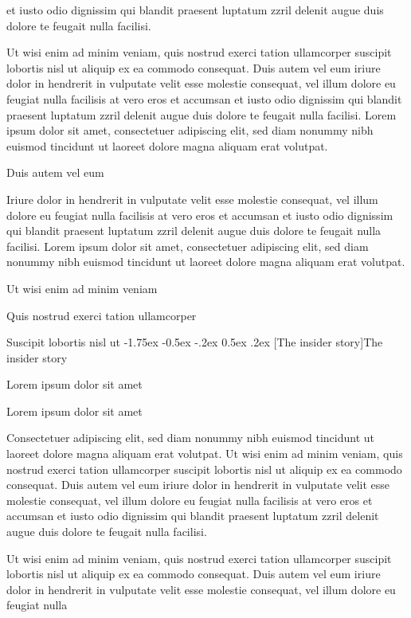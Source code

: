 \documentclass[11pt,twoside]{article}\makeatletter
\makeatletter
\renewcommand\section{\@startsection {section}{1}{\z@}%
     {-1.75ex \@plus -0.5ex \@minus -.2ex}%
     {0.5ex \@plus .2ex}%
     {\reset@font\Large\bfseries\sffamily}}
\renewcommand\subsection{\@startsection{subsection}{2}{\z@}%
     {-1.75ex\@plus -0.5ex \@minus- .2ex}%
     {0.5ex \@plus .2ex}%
     {\reset@font\Large\sffamily}}
\def\DivII{\subsection}
\def\DivII{\section}
\makeatother
\begin{document}
      et iusto odio dignissim qui blandit praesent luptatum zzril delenit
      augue duis dolore te feugait nulla facilisi.\par Ut wisi enim ad minim veniam, quis nostrud exerci tation
      ullamcorper suscipit lobortis nisl ut aliquip ex ea commodo
      consequat. Duis autem vel eum iriure dolor in hendrerit in vulputate
      velit esse molestie consequat, vel illum dolore eu feugiat nulla
      facilisis at vero eros et accumsan et iusto odio dignissim qui blandit
      praesent luptatum zzril delenit augue duis dolore te feugait nulla
      facilisi. Lorem ipsum dolor sit amet, consectetuer adipiscing elit,
      sed diam nonummy nibh euismod tincidunt ut laoreet dolore magna
      aliquam erat volutpat. \par Duis autem vel eum \par Iriure dolor in hendrerit in vulputate velit esse molestie
      consequat, vel illum dolore eu feugiat nulla facilisis at vero eros et
      accumsan et iusto odio dignissim qui blandit praesent luptatum zzril
      delenit augue duis dolore te feugait nulla facilisi. Lorem ipsum dolor
      sit amet, consectetuer adipiscing elit, sed diam nonummy nibh euismod
      tincidunt ut laoreet dolore magna aliquam erat volutpat. \par Ut wisi enim ad minim veniam\par Quis nostrud exerci tation ullamcorper \par Suscipit lobortis nisl ut 
\DivII[The insider story]{The insider story}\label{part2.1}\par Lorem ipsum dolor sit amet\par Lorem ipsum dolor sit amet\par Consectetuer adipiscing elit, sed diam nonummy nibh euismod
      tincidunt ut laoreet dolore magna aliquam erat volutpat. Ut wisi enim
      ad minim veniam, quis nostrud exerci tation ullamcorper suscipit
      lobortis nisl ut aliquip ex ea commodo consequat. Duis autem vel eum
      iriure dolor in hendrerit in vulputate velit esse molestie consequat,
      vel illum dolore eu feugiat nulla facilisis at vero eros et accumsan
      et iusto odio dignissim qui blandit praesent luptatum zzril delenit
      augue duis dolore te feugait nulla facilisi.\par Ut wisi enim ad minim veniam, quis nostrud exerci tation
      ullamcorper suscipit lobortis nisl ut aliquip ex ea commodo
      consequat. Duis autem vel eum iriure dolor in hendrerit in vulputate
      velit esse molestie consequat, vel illum dolore eu feugiat nulla
\end{document}
